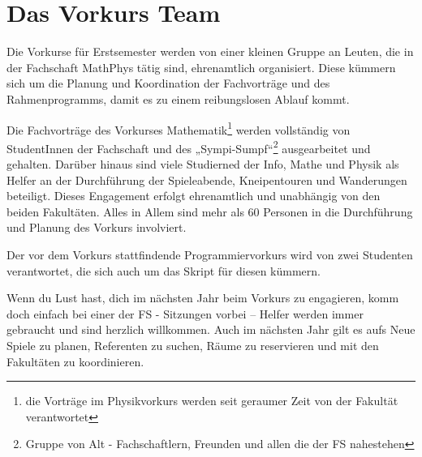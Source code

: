 \section{Das Vorkurs Team}
Die Vorkurse für Erstsemester werden von einer kleinen Gruppe an Leuten, die in
der Fachschaft MathPhys tätig sind, ehrenamtlich organisiert. Diese kümmern
sich um die Planung und Koordination der Fachvorträge und des Rahmenprogramms,
damit es zu einem reibungslosen Ablauf kommt.

Die Fachvorträge des Vorkurses Mathematik\footnote{die Vorträge im
Physikvorkurs werden seit geraumer Zeit von der Fakultät  verantwortet} werden
vollständig von StudentInnen der Fachschaft und des „Sympi-Sumpf“\footnote{Gruppe von Alt - Fachschaftlern, Freunden und allen die der FS
nahestehen} ausgearbeitet und gehalten. Darüber hinaus sind viele Studierned
der Info, Mathe und Physik als Helfer an der Durchführung der Spieleabende,
Kneipentouren und Wanderungen beteiligt. Dieses Engagement erfolgt ehrenamtlich
und unabhängig von den beiden Fakultäten. Alles in Allem sind mehr als 60
Personen in die Durchführung und Planung des Vorkurs involviert.

Der vor dem Vorkurs stattfindende Programmiervorkurs wird von zwei Studenten
verantwortet, die sich auch um das Skript für diesen kümmern.

Wenn du Lust hast, dich im nächsten Jahr beim Vorkurs zu engagieren, komm doch
einfach bei einer der FS - Sitzungen vorbei -- Helfer werden immer gebraucht
und sind herzlich willkommen. Auch im nächsten Jahr gilt es aufs Neue Spiele zu
planen, Referenten zu suchen, Räume zu reservieren und mit den Fakultäten zu
koordinieren.

